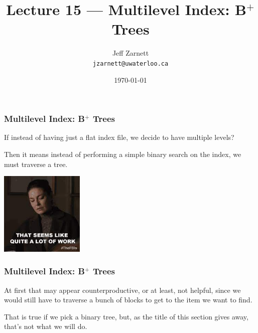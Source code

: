 

\title{Lecture 15 --- Multilevel Index: B$^{+}$ Trees }

\author{Jeff Zarnett \\ \small \texttt{jzarnett@uwaterloo.ca}}
\date{\today}




\begin{frame}
  \titlepage

 \end{frame}



\begin{frame}
\frametitle{Multilevel Index: B$^{+}$ Trees}

If instead of having just a flat index file, we decide to have multiple levels? 

Then it means instead of performing a simple binary search on the index, we must traverse a tree. 

\begin{center}
	\includegraphics[width=0.3\textwidth]{images/toomuchwork.jpg}
\end{center}

 \end{frame}



\begin{frame}
\frametitle{Multilevel Index: B$^{+}$ Trees}

At first that may appear counterproductive, or at least, not helpful, since we would still have to traverse a bunch of blocks to get to the item we want to find. 

That is true if we pick a binary tree, but, as the title of this section gives away, that's not what we will do.

\end{frame}


